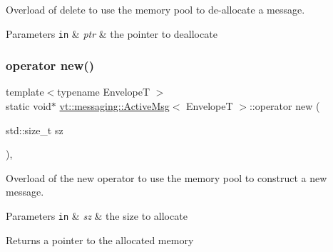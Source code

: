 Overload of delete to use the memory pool to de-\/allocate a message. 


\begin{DoxyParams}[1]{Parameters}
\mbox{\tt in}  & {\em ptr} & the pointer to deallocate \\
\hline
\end{DoxyParams}
\mbox{\label{structvt_1_1messaging_1_1_active_msg_ac79d16742251f19ed94f9725ed866f64}} 
\subsubsection{\texorpdfstring{operator new()}{operator new()}\hspace{0.1cm}{\footnotesize\ttfamily [1/3]}}
{\footnotesize\ttfamily template$<$typename EnvelopeT $>$ \\
static void$\ast$ \hyperlink{structvt_1_1messaging_1_1_active_msg}{vt\+::messaging\+::\+Active\+Msg}$<$ EnvelopeT $>$\+::operator new (\begin{DoxyParamCaption}\item[{std\+::size\+\_\+t}]{sz }\end{DoxyParamCaption})\hspace{0.3cm}{\ttfamily [inline]}, {\ttfamily [static]}}



Overload of the new operator to use the memory pool to construct a new message. 


\begin{DoxyParams}[1]{Parameters}
\mbox{\tt in}  & {\em sz} & the size to allocate\\
\hline
\end{DoxyParams}
\begin{DoxyReturn}{Returns}
a pointer to the allocated memory 
\end{DoxyReturn}
\mbox{\label{structvt_1_1messaging_1_1_active_msg_ac13140f75e5238670c81589a84881ac1}} 

